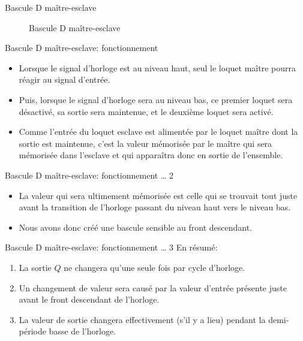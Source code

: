 \documentclass[presentation]{beamer}
\begin{document}
\begin{frame}[label={sec:orgb8d0646}]{Bascule D maître-esclave}
\begin{figure}[htbp]
\centering

\caption{\label{fig:orga058dfd}Bascule D maître-esclave}
\end{figure}
\end{frame}

\begin{frame}[label={sec:orga2a006e}]{Bascule D maître-esclave: fonctionnement}
\begin{itemize}
\item Lorsque le signal d'horloge est au niveau haut, seul le loquet maître pourra réagir au signal d'entrée.

\item Puis, lorsque le signal d'horloge sera au niveau bas, ce premier loquet sera désactivé, sa sortie sera maintenue, et le deuxième loquet sera activé.

\item Comme l'entrée du loquet esclave est alimentée par le loquet maître dont la sortie est maintenue, c'est la valeur mémorisée par le maître qui sera mémorisée dans l'esclave et qui apparaîtra donc en sortie de l'ensemble.
\end{itemize}
\end{frame}

\begin{frame}[label={sec:org3d959d2}]{Bascule D maître-esclave: fonctionnement \ldots{} 2}
\begin{itemize}
\item La valeur qui sera ultimement mémorisée est celle qui se trouvait tout juste avant la transition de l'horloge passant du niveau haut vers le niveau bas.

\item Nous avons donc créé une bascule sensible au \alert{front descendant}.
\end{itemize}
\end{frame}

\begin{frame}[label={sec:org393a0e6}]{Bascule D maître-esclave: fonctionnement \ldots{} 3}
En résumé:

\begin{enumerate}
\item La sortie \(Q\) ne changera qu'une seule fois par cycle d'horloge.
\item Un changement de valeur sera causé par la valeur d'entrée présente
juste avant le front descendant de l'horloge.
\item La valeur de sortie changera effectivement (s'il y a lieu) pendant
la demi-période basse de l'horloge.
\end{enumerate}
\end{frame}
\end{document}
